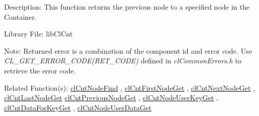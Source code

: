 \begin{Desc}
\item[Description:]This function returns the previous node to a specified node in the Container.\end{Desc}
\begin{Desc}
\item[Library File:]lib\-Cl\-Cnt\end{Desc}
\begin{Desc}
\item[Note:]Returned error is a combination of the component id and error code. Use \textit{CL\_\-GET\_\-ERROR\_\-CODE(RET\_\-CODE)} defined in \textit{clCommonErrors.h} to retrieve the error code.\end{Desc}
\begin{Desc}
\item[Related Function(s):]\hyperlink{pagecnt109}{cl\-Cnt\-Node\-Find} , \hyperlink{pagecnt110}{cl\-Cnt\-First\-Node\-Get} , 
\hyperlink{pagecnt112}{cl\-Cnt\-Next\-Node\-Get} , \hyperlink{pagecnt111}{cl\-Cnt\-Last\-Node\-Get} 
\hyperlink{pagecnt113}{cl\-Cnt\-Previous\-Node\-Get} , \hyperlink{pagecnt115}{cl\-Cnt\-Node\-User\-Key\-Get} , 
\hyperlink{pagecnt116}{cl\-Cnt\-Data\-For\-Key\-Get} , \hyperlink{pagecnt117}{cl\-Cnt\-Node\-User\-Data\-Get} \end{Desc}


\newpage
